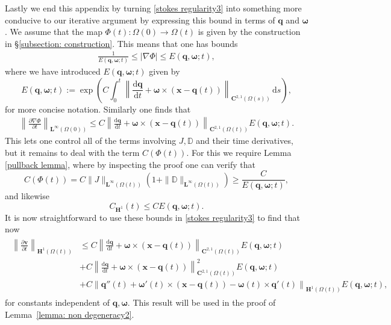 \documentclass[a4paper]{amsart}
\numberwithin{equation}{section}
\newcommand{\ddt}[1]{\frac{\partial #1}{\partial t}}
\newcommand{\grad}{\nabla}
\theoremstyle{plain}
\newcommand{\mbf}[1]{\mathbf{#1}}
\newcommand{\mbb}[1]{\mathbb{#1}}
\begin{document}
Lastly we end this appendix by turning \eqref{stokes regularity3} into something more conducive to our iterative argument by expressing this bound in terms of $\mbf{q}$ and $ \boldsymbol{\omega}$.
We assume that the map $\Phi(t): \Omega(0) \rightarrow \Omega(t)$ is given by the construction in \S \ref{subsection: construction}.
This means that one has bounds
\begin{gather*}
	\frac{1}{E(\mbf{q}, \boldsymbol{\omega};t)} \leq |\grad \Phi| \leq E(\mbf{q}, \boldsymbol{\omega};t), 
\end{gather*}
where we have introduced $E(\mbf{q}, \boldsymbol{\omega};t)$ given by
\[ E(\mbf{q}, \boldsymbol{\omega};t) :=  \exp \left( C \int_0^t \left\| \frac{\mathrm{d}\mbf{q}}{\mathrm{d}t} + \boldsymbol{\omega} \times (\mbf{x} - \mbf{q}(t)) \right\|_{\mbf{C}^{2,1}(\Omega(s))} \, \mathrm{d}s \right),\]
for more concise notation.
Similarly one finds that
\begin{align*}
    \left\|\ddt{\grad \Phi}\right\|_{\mbf{L}^\infty(\Omega(0))} \leq C \left\| \frac{\mathrm{d}\mbf{q}}{\mathrm{d}t} + \boldsymbol{\omega} \times (\mbf{x} - \mbf{q}(t)) \right\|_{\mbf{C}^{2,1}(\Omega(t))}E(\mbf{q}, \boldsymbol{\omega};t).
\end{align*}
This lets one control all of the terms involving $J, \mbb{D}$ and their time derivatives, but it remains to deal with the term $C(\Phi(t))$.
For this we require Lemma \ref{pullback lemma}, where by inspecting the proof one can verify that
\[ C(\Phi(t)) = C\|J\|_{\mbf{L}^\infty(\Omega(t))}(1 + \|\mbb{D}\|_{\mbf{L}^\infty(\Omega(t))}) \geq \frac{C}{E(\mbf{q}, \boldsymbol{\omega};t)},\]
and likewise
\[ C_{\mbf{H}^1}(t) \leq C E(\mbf{q}, \boldsymbol{\omega};t). \]
It is now straightforward to use these bounds in \eqref{stokes regularity3} to find that now
\begin{align}
\begin{aligned}
   \left\|  \ddt{\mbf{v}} \right\|_{\mbf{H}^1(\Omega(t))} &\leq C \left\| \frac{\mathrm{d}\mbf{q}}{\mathrm{d}t} + \boldsymbol{\omega} \times (\mbf{x} - \mbf{q}(t)) \right\|_{\mbf{C}^{2,1}(\Omega(t))} E(\mbf{q}, \boldsymbol{\omega};t)\\
   &+ C \left\| \frac{\mathrm{d}\mbf{q}}{\mathrm{d}t} + \boldsymbol{\omega} \times (\mbf{x} - \mbf{q}(t)) \right\|_{\mbf{C}^{2,1}(\Omega(t))}^2 E(\mbf{q}, \boldsymbol{\omega};t)\\
   &+ C\left\| \mbf{q}''(t) + \boldsymbol{\omega}'(t)\times(\mbf{x} - \mbf{q}(t)) - \boldsymbol{\omega}(t) \times \mbf{q}'(t) \right\|_{\mbf{H}^1(\Omega(t))} E(\mbf{q}, \boldsymbol{\omega};t),
   \end{aligned}
   \label{stokes regularity4}
\end{align}
for constants independent of $\mbf{q}, \boldsymbol{\omega}$.
This result will be used in the proof of Lemma~\ref{lemma: non degeneracy2}.
\end{document}
